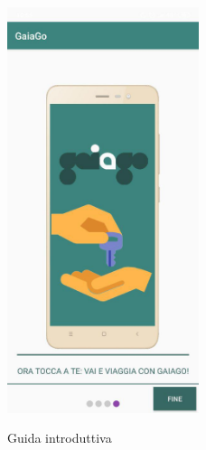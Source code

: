 \begin{figure}[H] 
	\centering 
	\includegraphics[width=0.5\textwidth]{res/images/intro4.jpg}\\
	\caption{Guida introduttiva}
	\label{guidaintroduttiva4}
\end{figure}
